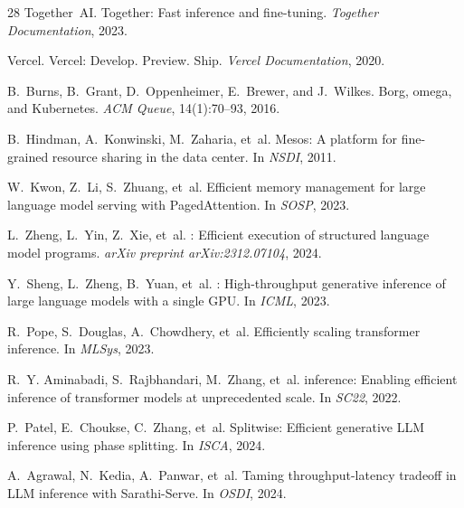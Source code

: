 \documentclass[11pt,twocolumn]{article}
\begin{document}
\begin{thebibliography}{28}
Together~AI.
\newblock Together: Fast inference and fine-tuning.
\newblock \emph{Together Documentation}, 2023.

Vercel.
\newblock Vercel: Develop. Preview. Ship.
\newblock \emph{Vercel Documentation}, 2020.

B.~Burns, B.~Grant, D.~Oppenheimer, E.~Brewer, and J.~Wilkes.
\newblock Borg, omega, and {Kubernetes}.
\newblock \emph{ACM Queue}, 14(1):70--93, 2016.

B.~Hindman, A.~Konwinski, M.~Zaharia, et~al.
\newblock Mesos: A platform for fine-grained resource sharing in the data center.
\newblock In \emph{NSDI}, 2011.

W.~Kwon, Z.~Li, S.~Zhuang, et~al.
\newblock Efficient memory management for large language model serving with {PagedAttention}.
\newblock In \emph{SOSP}, 2023.

L.~Zheng, L.~Yin, Z.~Xie, et~al.
: Efficient execution of structured language model programs.
\newblock \emph{arXiv preprint arXiv:2312.07104}, 2024.

Y.~Sheng, L.~Zheng, B.~Yuan, et~al.
: High-throughput generative inference of large language models with a single {GPU}.
\newblock In \emph{ICML}, 2023.

R.~Pope, S.~Douglas, A.~Chowdhery, et~al.
\newblock Efficiently scaling transformer inference.
\newblock In \emph{MLSys}, 2023.

R.~Y. Aminabadi, S.~Rajbhandari, M.~Zhang, et~al.
 inference: Enabling efficient inference of transformer models at unprecedented scale.
\newblock In \emph{SC22}, 2022.

P.~Patel, E.~Choukse, C.~Zhang, et~al.
\newblock Splitwise: Efficient generative {LLM} inference using phase splitting.
\newblock In \emph{ISCA}, 2024.

A.~Agrawal, N.~Kedia, A.~Panwar, et~al.
\newblock Taming throughput-latency tradeoff in {LLM} inference with {Sarathi-Serve}.
\newblock In \emph{OSDI}, 2024.

\end{thebibliography}
\end{document}
